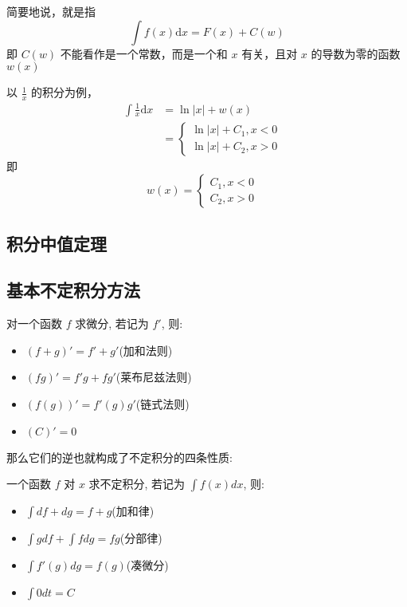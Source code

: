 \documentclass[lang=cn,newtx,10pt,scheme=chinese]{elegantbook}
\begin{document}
简要地说，就是指
\begin{equation}
  \int f(x) \mathrm{d}x =F(x)+C(w)
\end{equation}
即 $C(w)$ 不能看作是一个常数，而是一个和 $x$ 有关，且对 $x$ 的导数为零的函数 $w(x)$
\begin{example}

  以 $\frac{1}{x} $ 的积分为例，
  \begin{equation}
    \begin{aligned}
    \int \frac{1}{x} \mathrm{d}x&=\ln \left\vert x \right\vert +w(x) \\
    &=\begin{cases} \ln \left\vert x \right\vert +C_1 , x<0 &  \\ \ln \left\vert x \right\vert +C_2 , x>0&  \end{cases}
    \end{aligned}
  \end{equation}
  即 \begin{equation}
    w(x)=\begin{cases} C_1 , x<0 &  \\ C_2 , x>0&  \end{cases}
  \end{equation}
\end{example}
    \subsection{积分中值定理}
    \subsection{基本不定积分方法}

    \begin{proposition}[微分的四条法则]
  对一个函数 $f$ 求微分, 若记为 $f'$, 则:
  \begin{itemize}
    \item $(f + g)' = f' + g'$(加和法则)
    \item $(fg)' = f'g + fg'$(莱布尼兹法则)
    \item $(f(g))' = f'(g) g'$(链式法则)
    \item $(C)' = 0$
  \end{itemize}
\end{proposition}

那么它们的逆也就构成了不定积分的四条性质:

\begin{proposition}[不定积分的四条性质]
  一个函数 $f$ 对 $x$ 求不定积分, 若记为 $\int f(x)dx$, 则:
  \begin{itemize}
    \item $\int df + dg = f + g$(加和律)
    \item $\int g df + \int f dg = fg$(分部律)
    \item $\int f'(g) dg = f(g)$(凑微分)
    \item $\int 0 dt = C$
  \end{itemize}
\end{proposition}
\end{document}
